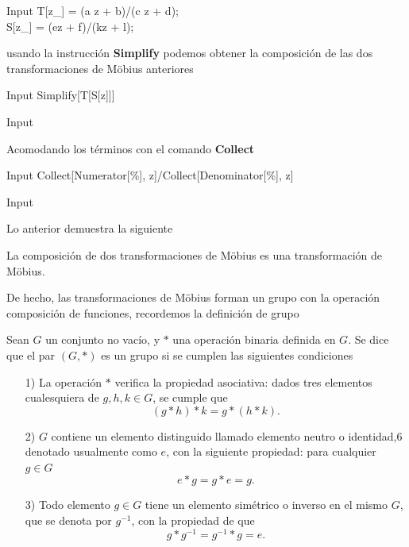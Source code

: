 \begin{mmaCell}{Input}
	 T[z_] = (a z + b)/(c z + d);\\S[z_] = (ez + f)/(kz + l);
\end{mmaCell}
usando la instrucción \textbf{Simplify} podemos obtener la composición de las dos transformaciones de M\"obius anteriores  
\begin{mmaCell}{Input}
	 Simplify[T[S[z]]]
\end{mmaCell}
\begin{mmaCell}[moredefined={f, d}]{Input}
\end{mmaCell}
Acomodando los términos con el comando \textbf{Collect}
\begin{mmaCell}{Input}
	  Collect[Numerator[\%], z]/Collect[Denominator[\%], z]
\end{mmaCell}

\begin{mmaCell}[moredefined={f, d}]{Input}
\end{mmaCell}
Lo anterior demuestra la siguiente 
\begin{prop}
	La composición de dos transformaciones de M\"obius es una transformación
	de M\"obius.
\end{prop}

De hecho, las transformaciones de M\"obius forman un grupo con la operación composición de funciones, recordemos la definición de grupo
\begin{defi}
	Sean $G$  un conjunto no vacío, y $*$ una operación binaria definida en $G$. Se dice que el par $( G , * )$ es un grupo si se cumplen las siguientes condiciones
	\begin{itemize}
		\item [1)] La operación $*$ verifica la propiedad asociativa: dados tres elementos cualesquiera de $g , h , k \in G$, se cumple que $$ (g* h)* k=g* (h*k).$$
		\item [2)] $G$ contiene un elemento distinguido llamado elemento neutro o identidad,6 denotado usualmente como $e$, con la siguiente propiedad: para cualquier $g\in G$
		$$e * g = g * e = g.$$ 
		\item [3)] Todo elemento $ g\in G$ tiene un elemento simétrico o inverso en el mismo  $G$, que se denota por $g^{-1}$, con la propiedad de que $$ g* g^{-1}=g^{-1}* g=e.$$
	\end{itemize}
\end{defi}

